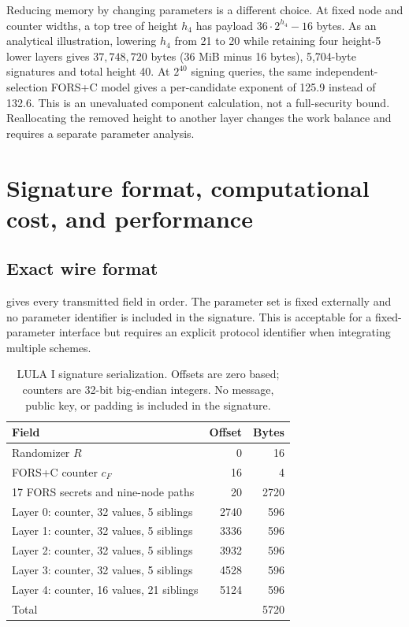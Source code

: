 \documentclass[a4paper,envcountsame,runningheads]{llncs}
\begin{document}
Reducing memory by changing parameters is a different choice. At fixed node and counter widths, a top tree of height $h_4$ has payload $36\cdot2^{h_4}-16$ bytes. As an analytical illustration, lowering $h_4$ from 21 to 20 while retaining four height-5 lower layers gives $37{,}748{,}720$ bytes ($36$ MiB minus 16 bytes), 5,704-byte signatures and total height 40. At $2^{40}$ signing queries, the same independent-selection FORS+C model gives a per-candidate exponent of 125.9 instead of 132.6. This is an unevaluated component calculation, not a full-security bound. Reallocating the removed height to another layer changes the work balance and requires a separate parameter analysis.



\section{Signature format, computational cost, and performance}\label{sec:cost}

\subsection{Exact wire format}
 gives every transmitted field in order. The parameter set is fixed externally and no parameter identifier is included in the signature. This is acceptable for a fixed-parameter interface but requires an explicit protocol identifier when integrating multiple schemes.

\begin{table}[t]
\caption{LULA I signature serialization. Offsets are zero based; counters are 32-bit big-endian integers. No message, public key, or padding is included in the signature.}\label{tab:wire}
\centering\small
\begin{tabular}{P{49mm}rr}\toprule
Field & Offset & Bytes\\\midrule
Randomizer $R$ &0&16\\
FORS+C counter $c_F$ &16&4\\
17 FORS secrets and nine-node paths &20&2720\\
Layer 0: counter, 32 values, 5 siblings &2740&596\\
Layer 1: counter, 32 values, 5 siblings &3336&596\\
Layer 2: counter, 32 values, 5 siblings &3932&596\\
Layer 3: counter, 32 values, 5 siblings &4528&596\\
Layer 4: counter, 16 values, 21 siblings &5124&596\\\midrule
Total &&5720\\\bottomrule
\end{tabular}
\end{table}
\end{document}
